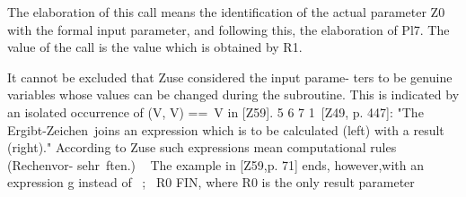 The elaboration of this call means the
identification of the actual parameter Z0 with the formal
input parameter, and following this, the elaboration of
Pl7. The value of the call is the value which is obtained
by R1.

It cannot be excluded that Zuse considered the input parame-
ters to be genuine variables whose values can be changed during
the subroutine. This is indicated by an isolated occurrence of
(V, V) ==~V in [Z59].
5 6 7
1~[Z49, p. 447]: "The Ergibt-Zeichen~joins an expression
which is to be calculated (left) with a result (right)." According to
Zuse such expressions mean computational rules (Rechenvor-
sehr~ften.)
~ The example in [Z59,p. 71] ends, however,with an expression g
instead of ~;~ R0 FIN, where R0 is the only result parameter